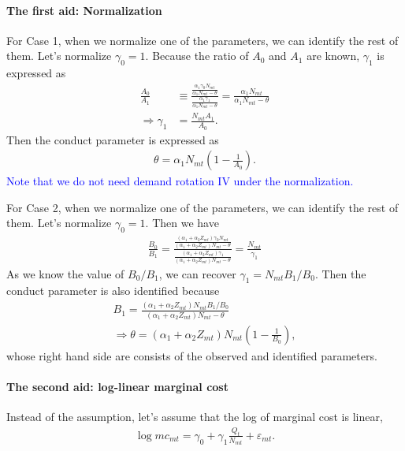\documentclass[11pt]{article}
\begin{document}
\paragraph{The first aid: Normalization}

For Case 1, when we normalize one of the parameters, we can identify the rest of them. Let's normalize $\gamma_0 = 1$. Because the ratio of $A_0$ and $A_1$ are known, $\gamma_1$ is expressed as 
    \begin{align*}
        \frac{A_0}{A_1} &\equiv  \frac{\frac{\alpha_1 \gamma_0 N_{mt}}{\alpha_1 N_{mt}-\theta}}{\frac{\alpha_1 \gamma_1}{\alpha_1 N_{mt}-\theta}} = \frac{\alpha_1 N_{mt}}{\alpha_1 N_{mt}-\theta}\\
        \Longrightarrow \gamma_1 &= \frac{N_{mt}A_1}{A_0}.
    \end{align*}
    Then the conduct parameter is expressed as 
    \begin{align*}
        \theta = \alpha_1 N_{mt} \left(1 - \frac{1}{A_0}\right).
    \end{align*}
    \textcolor{blue}{Note that we do not need demand rotation IV under the normalization.}

For Case 2, when we normalize one of the parameters, we can identify the rest of them. Let's normalize $\gamma_0 = 1$.  Then we have 
    \begin{align*}
    \frac{B_0}{B_1} = \frac{\frac{(\alpha_1+\alpha_2 Z_{mt}) \gamma_0 N_{mt}}{(\alpha_1+\alpha_2 Z_{mt}) N_{mt}-\theta}}{\frac{(\alpha_1+\alpha_2 Z_{mt}) \gamma_1}{(\alpha_1+\alpha_2 Z_{mt}) N_{mt}-\theta}} = \frac{N_{mt}}{\gamma_1}
    \end{align*}
    As we know the value of $B_0/B_1$, we can recover $\gamma_1 = N_{mt}B_1/B_0$. Then the conduct parameter is also identified because \begin{align*}
        B_1 = \frac{(\alpha_1+\alpha_2 Z_{mt})N_{mt}B_1/B_0 }{(\alpha_1+\alpha_2 Z_{mt}) N_{mt}-\theta}\\
        \Longrightarrow \theta = (\alpha_1+\alpha_2 Z_{mt})N_{mt}\left(1 -\frac{1}{B_0}\right),
    \end{align*}
    whose right hand side are consists of the observed and identified parameters.


\paragraph{The second aid: log-linear marginal cost}

Instead of the assumption, let's assume that the log of marginal cost is linear, 
\begin{align*}
\log mc_{mt} = \gamma_0 + \gamma_1 \frac{Q_t}{N_{mt}} +\varepsilon_{mt}.
\end{align*}
\end{document}
